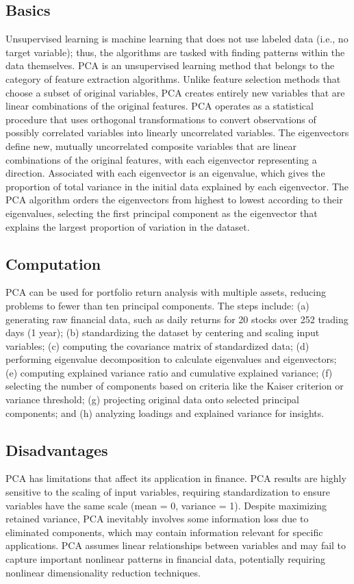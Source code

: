 \documentclass{article}
\begin{document}
\subsection{Basics}
Unsupervised learning is machine learning that does not use labeled data (i.e., no target variable); thus, the algorithms are tasked with finding patterns within the data themselves. PCA is an unsupervised learning method that belongs to the category of feature extraction algorithms. Unlike feature selection methods that choose a subset of original variables, PCA creates entirely new variables that are linear combinations of the original features. PCA operates as a statistical procedure that uses orthogonal transformations to convert observations of possibly correlated variables into linearly uncorrelated variables. The eigenvectors define new, mutually uncorrelated composite variables that are linear combinations of the original features, with each eigenvector representing a direction. Associated with each eigenvector is an eigenvalue, which gives the proportion of total variance in the initial data explained by each eigenvector. The PCA algorithm orders the eigenvectors from highest to lowest according to their eigenvalues, selecting the first principal component as the eigenvector that explains the largest proportion of variation in the dataset.

\subsection{Computation}
PCA can be used for portfolio return analysis with multiple assets, reducing problems to fewer than ten principal components. The steps include: (a) generating raw financial data, such as daily returns for 20 stocks over 252 trading days (1 year); (b) standardizing the dataset by centering and scaling input variables; (c) computing the covariance matrix of standardized data; (d) performing eigenvalue decomposition to calculate eigenvalues and eigenvectors; (e) computing explained variance ratio and cumulative explained variance; (f) selecting the number of components based on criteria like the Kaiser criterion or variance threshold; (g) projecting original data onto selected principal components; and (h) analyzing loadings and explained variance for insights.

\subsection{Disadvantages}
PCA has limitations that affect its application in finance. PCA results are highly sensitive to the scaling of input variables, requiring standardization to ensure variables have the same scale (mean = 0, variance = 1). Despite maximizing retained variance, PCA inevitably involves some information loss due to eliminated components, which may contain information relevant for specific applications. PCA assumes linear relationships between variables and may fail to capture important nonlinear patterns in financial data, potentially requiring nonlinear dimensionality reduction techniques.
\end{document}
